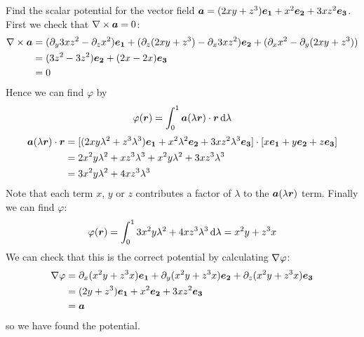 \documentclass{article}
\begin{document}
    \example
    Find the scalar potential for the vector field \(\bm{a} = (2xy + z^3)\bm{e_{1}} + x^2\bm{e_{2}} + 3xz^2\bm{e_{3}}\).
    First we check that \(\nabla\times\bm{a} = 0\):
    \begin{align*}
        \nabla\times\bm{a} &= (\partial_y 3xz^2 - \partial_z x^2)\bm{e_{1}} + (\partial_z(2xy + z^3) - \partial_x 3xz^2)\bm{e_{2}} + (\partial_x x^2 - \partial_y(2xy + z^3))\\
        &= (3z^2 - 3z^2)\bm{e_{2}} + (2x - 2x)\bm{e_{3}}\\
        &= 0
    \end{align*}
    Hence we can find \(\varphi\) by
    \[\varphi(\bm{r}) = \int_0^1\bm{a}(\lambda\bm{r})\cdot\bm{r}\,\dd\lambda\]
    \begin{align*}
        \bm{a}(\lambda\bm{r})\cdot\bm{r} &= [(2xy\lambda^2 + z^3\lambda^3)\bm{e_{1}} + x^2\lambda^2\bm{e_{2}} + 3xz^2\lambda^3\bm{e_{3}}]\cdot[x\bm{e_{1}} + y\bm{e_{2}} + z\bm{e_{3}}]\\
        &= 2x^2y\lambda^2 + xz^3\lambda^3 + x^2y\lambda^2 + 3xz^3\lambda^3\\
        &= 3x^2y\lambda^2 + 4xz^3\lambda^3
    \end{align*}
    Note that each term \(x\), \(y\) or \(z\) contributes a factor of \(\lambda\) to the \(\bm{a}(\lambda\bm{r})\) term.
    Finally we can find \(\varphi\):
    \[\varphi(\bm{r}) = \int_0^1 3x^2y\lambda^2 + 4xz^3\lambda^3\,\dd\lambda = x^2y + z^3x\]
    We can check that this is the correct potential by calculating \(\nabla\varphi\):
    \begin{align*}
        \nabla\varphi &= \partial_x(x^2y + z^3 x)\bm{e_{1}} + \partial_y(x^2y + z^3 x)\bm{e_{2}} + \partial_z(x^2y + z^3 x)\bm{e_{3}}\\
        &= (2y + z^3)\bm{e_{1}} + x^2\bm{e_{2}} + 3xz^2\bm{e_{3}}\\
        &= \bm{a}
    \end{align*}
    so we have found the potential.
    
\end{document}
